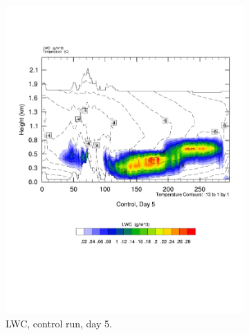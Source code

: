 \begin{figure}[h]
    \begin{subfigure}{0.48\textwidth}
        \centering
        \includegraphics[width=\textwidth]{results/crossSec_LWC_Control_Day5.pdf}
        \caption{LWC, control run, day 5.}
        \label{subfig:cross_LWC_Day5}
    \end{subfigure}
    \begin{subfigure}{0.48\textwidth}
        \centering

\end{subfigure}
\end{figure}

